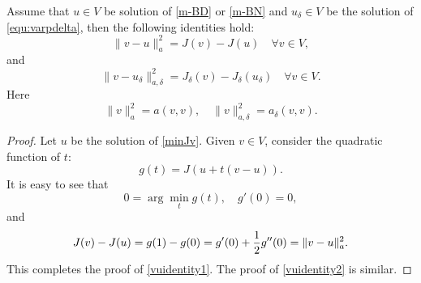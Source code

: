 \begin{lemma} \label{lem:JvJu}
Assume that $u\in V$ be solution of \eqref{m-BD} or \eqref{m-BN} and $u_\delta\in V$ be the solution of \eqref{equ:varpdelta}, then
the following identities hold:
\begin{equation}\label{vuidentity1}
\|v-u\|_{a}^2=J(v)-J(u)\quad \forall v\in V,
\end{equation}
and
\begin{equation}\label{vuidentity2}
\|v-u_\delta\|_{a,\delta}^2=J_{\delta}(v)-J_{\delta}(u_{\delta})\quad \forall v\in V. 
\end{equation}
Here
\begin{equation}
  \label{a-norm}
\|v\|_{a}^2=a(v,v),\quad \|v\|_{a,\delta}^2=a_\delta(v,v).
\end{equation}
\end{lemma}
\begin{proof}
Let $u$ be the solution of \eqref{minJv}. Given $v\in V$, consider the quadratic function of $t$:
$$
g(t)=J(u+t(v-u)).
$$
It is easy to see that 
$$
0=\arg\min_{t}g(t), \quad g'(0)=0,
$$
and
$$
J(v)-J(u)=g(1)-g(0)=g'(0)+{1\over2}g''(0)=\|v-u\|_{a}^2.
$$
This completes the proof of \eqref{vuidentity1}. The proof of \eqref{vuidentity2} is similar. 
\end{proof} 

